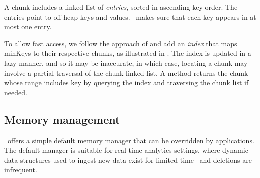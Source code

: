 A chunk includes a linked list of \emph{entries},  
sorted in ascending key order. 
The entries point to off-heap keys and values. 
\oak\ makes sure that each key appears in at most one entry.


To allow fast access, we follow the approach of \cite{the-art-of,index-1,index-2,kiwi,transactional-lib} and add an \textit{index} 
that maps minKeys to their respective chunks, as illustrated in . %
The index %
is updated in a lazy manner, and so it may be inaccurate, in which case, locating a chunk may involve a partial 
traversal of the chunk linked list. %
A  method returns the chunk whose range includes  key  by querying the index and traversing the chunk list if needed. 






\subsection{Memory management}
\label{ssec:mm} 

\oak\ offers a simple default memory manager  that can be overridden by applications.
The default manager  is suitable for real-time analytics settings, where  
dynamic data structures  used to ingest new data  exist for limited time~\cite{Druid,hbase} and
deletions are infrequent.

